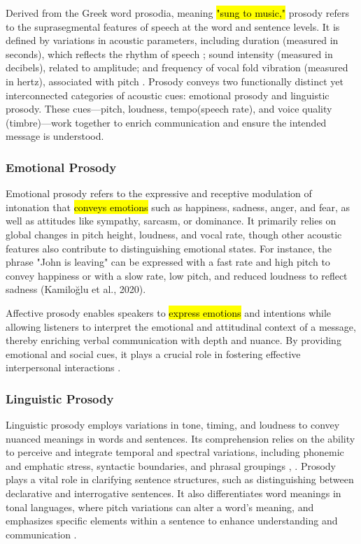 Derived from the Greek word prosodia, meaning \hl{"sung to music,"} prosody refers to the suprasegmental features of speech at the word and sentence levels. It is defined by variations in acoustic parameters, including duration (measured in seconds), which reflects the rhythm of speech \cite{cummins_fascinating_2000}; sound intensity (measured in decibels), related to amplitude; and frequency of vocal fold vibration (measured in hertz), associated with pitch \cite{noauthor_theory_nodate}. Prosody conveys two functionally distinct yet interconnected categories of acoustic cues: emotional prosody and linguistic prosody. These cues—pitch, loudness, tempo(speech rate), and voice quality (timbre)—work together to enrich communication and ensure the intended message is understood. 

\subsubsection{Emotional Prosody} 

Emotional prosody refers to the expressive and receptive modulation of intonation that \hl{conveys emotions} such as happiness, sadness, anger, and fear, as well as attitudes like sympathy, sarcasm, or dominance. It primarily relies on global changes in pitch height, loudness, and vocal rate, though other acoustic features also contribute to distinguishing emotional states. For instance, the phrase "John is leaving" can be expressed with a fast rate and high pitch to convey happiness or with a slow rate, low pitch, and reduced loudness to reflect sadness \cite{noauthor_good_nodate}(Kamiloğlu et al., 2020).

Affective prosody enables speakers to \hl{express emotions} and intentions while allowing listeners to interpret the emotional and attitudinal context of a message, thereby enriching verbal communication with depth and nuance. By providing emotional and social cues, it plays a crucial role in fostering effective interpersonal interactions \cite{sauter_cross-cultural_2010} \cite{ekman_pan-cultural_1969}.

\subsubsection{Linguistic Prosody} 
Linguistic prosody employs variations in tone, timing, and loudness to convey nuanced meanings in words and sentences. Its comprehension relies on the ability to perceive and integrate temporal and spectral variations, including phonemic and emphatic stress, syntactic boundaries, and phrasal groupings \cite{baum_sensitivity_2003}, \cite{ross_lateralization_1997}. Prosody plays a vital role in clarifying sentence structures, such as distinguishing between declarative and interrogative sentences. It also differentiates word meanings in tonal languages, where pitch variations can alter a word’s meaning, and emphasizes specific elements within a sentence to enhance understanding and communication \cite{ukaegbe_aprosodia_2022}.

